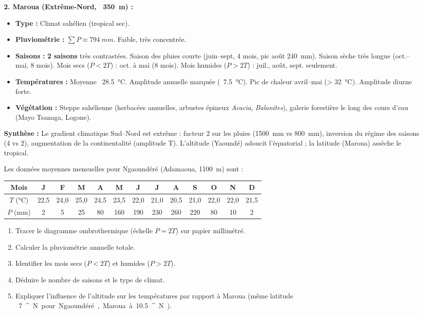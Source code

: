\documentclass[11pt]{article}
\providecommand{\degree}{^{\circ}}
\begin{document}
\begin{exoresolu}
\noindent\textbf{2. Maroua (Extrême-Nord, ~\SI{350}{m}) :}
\begin{itemize}
    \item \textbf{Type :} Climat sahélien (tropical sec).
    \item \textbf{Pluviométrie :} $\sum P \approx \SI{794}{mm}$. Faible, très concentrée.
    \item \textbf{Saisons :} \textbf{2 saisons} très contrastées. Saison des pluies courte (juin--sept, 4 mois, pic août \SI{240}{mm}). Saison sèche très longue (oct.--mai, 8 mois). Mois secs ($P < 2T$) : oct. à mai (8 mois). Mois humides ($P > 2T$) : juil., août, sept. seulement.
    \item \textbf{Températures :} Moyenne ~\SI{28,5}{\celsius}. Amplitude annuelle marquée (~\SI{7,5}{\celsius}). Pic de chaleur avril--mai (> \SI{32}{\celsius}). Amplitude diurne forte.
    \item \textbf{Végétation :} Steppe sahélienne (herbacées annuelles, arbustes épineux \emph{Acacia}, \emph{Balanites}), galerie forestière le long des cours d'eau (Mayo Tsanaga, Logone).
\end{itemize}

\noindent\textbf{Synthèse :} Le gradient climatique Sud--Nord est extrême : facteur 2 sur les pluies (\SI{1 500}{mm} vs \SI{800}{mm}), inversion du régime des saisons (4 vs 2), augmentation de la continentalité (amplitude T). L'altitude (Yaoundé) adoucit l'équatorial ; la latitude (Maroua) assèche le tropical.
\end{exoresolu}

\begin{exercice}
Les données moyennes mensuelles pour Ngaoundéré (Adamaoua, \SI{1 100}{m}) sont :
\begin{center}
\begin{tabular}{|c|c|c|c|c|c|c|c|c|c|c|c|c|}\hline
Mois & J & F & M & A & M & J & J & A & S & O & N & D \\\hline
$T$ (\si{\celsius}) & 22,5 & 24,0 & 25,0 & 24,5 & 23,5 & 22,0 & 21,0 & 20,5 & 21,0 & 22,0 & 22,0 & 21,5 \\\hline
$P$ (mm) & 2 & 5 & 25 & 80 & 160 & 190 & 230 & 260 & 220 & 80 & 10 & 2 \\\hline
\end{tabular}
\end{center}
\begin{enumerate}
    \item Tracer le diagramme ombrothermique (échelle $P = 2T$) sur papier millimétré.
    \item Calculer la pluviométrie annuelle totale.
    \item Identifier les mois secs ($P < 2T$) et humides ($P > 2T$).
    \item Déduire le nombre de saisons et le type de climat.
    \item Expliquer l'influence de l'altitude sur les températures par rapport à Maroua (même latitude ~\SI{7}{\degree} N pour Ngaoundéré, Maroua à ~\SI{10,5}{\degree} N).
\end{enumerate}
\end{exercice}
\end{document}
